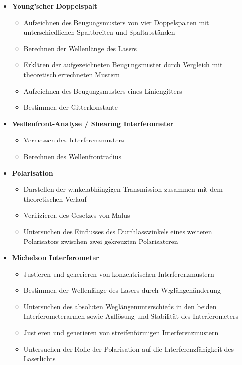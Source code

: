 \documentclass[ngerman]{scrartcl}
\begin{document}
\begin{itemize}
    \item \textbf{Young'scher Doppelspalt}
          \begin{itemize}
              \item Aufzeichnen des Beugungsmusters von vier Doppelspalten mit unterschiedlichen Spaltbreiten und Spaltabständen %
              \item Berechnen der Wellenlänge des Lasers %
              \item Erklären der aufgezeichneten Beugungsmuster durch Vergleich mit theoretisch errechneten Mustern %
              \item Aufzeichnen des Beugungsmusters eines Liniengitters %
              \item Bestimmen der Gitterkonstante %
          \end{itemize}
    \item \textbf{Wellenfront-Analyse / Shearing Interferometer}
          \begin{itemize}
              \item Vermessen des Interferenzmusters %
              \item Berechnen des Wellenfrontradius %
          \end{itemize}
    \item \textbf{Polarisation}
          \begin{itemize}
              \item Darstellen der winkelabhängigen Transmission zusammen mit dem theoretischen Verlauf %
              \item Verifizieren des Gesetzes von Malus %
              \item Untersuchen des Einflusses des Durchlasswinkels eines weiteren Polarisators zwischen zwei gekreuzten Polarisatoren %
          \end{itemize}
    \item \textbf{Michelson Interferometer}
          \begin{itemize}
              \item Justieren und generieren von konzentrischen Interferenzmustern %
              \item Bestimmen der Wellenlänge des Lasers durch Weglängenänderung %
              \item Untersuchen des absoluten Weglängenunterschieds in den beiden Interferometerarmen sowie Auflösung und Stabilität des Interferometers %
              \item Justieren und generieren von streifenförmigen Interferenzmustern %
              \item Untersuchen der Rolle der Polarisation auf die Interferenzfähigkeit des Laserlichts %
          \end{itemize}
\end{itemize}
\end{document}

